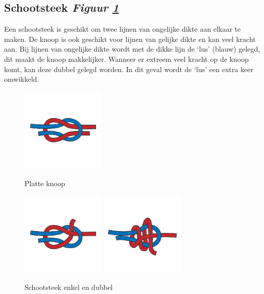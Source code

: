 \subsection{Schootsteek \hfill \textit{Figuur \ref{pic:schoot_steek}}}
Een schootsteek is geschikt om twee lijnen van ongelijke dikte aan elkaar te maken. De knoop is ook geschikt voor lijnen van gelijke dikte en kan veel kracht aan. Bij lijnen van ongelijke dikte wordt met de dikke lijn de `lus' (blauw) gelegd, dit maakt de knoop makkelijker. Wanneer er extreem veel kracht op de knoop komt, kan deze dubbel gelegd worden. In dit geval wordt de `lus' een extra keer omwikkeld. 
 
\begin{figure}[h]
  \centering
  \begin{minipage}[b]{0.32\textwidth}
  \centering
    \includegraphics[height=4cm]{Hoofdstukken/Schiemannen/pdf/platteknoop.pdf}
    \caption{Platte knoop}
    \label{pic:platte_knoop}
  \end{minipage}
  \hfill
  \begin{minipage}[b]{0.64\textwidth}
    \centering
    \includegraphics[height=4cm]{Hoofdstukken/Schiemannen/pdf/schootsteek.pdf}
    \hspace*{1cm}
    \includegraphics[height=4cm]{Hoofdstukken/Schiemannen/pdf/dubbele_schootsteek.pdf}
    \caption{Schootsteek enkel en dubbel}
    \label{pic:schoot_steek}
    \end{minipage}
  \hfill
\end{figure}
